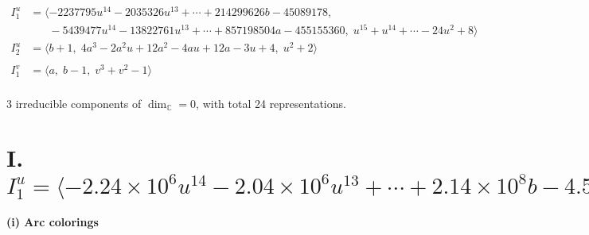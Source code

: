 \documentclass[1p]{elsarticle_modified}
\theoremstyle{definition}
\begin{document}
\begin{align*}
I^u_{1}&=\langle 
-2237795 u^{14}-2035326 u^{13}+\cdots+214299626 b-45089178,\\
\phantom{I^u_{1}}&\phantom{= \langle  }-5439477 u^{14}-13822761 u^{13}+\cdots+857198504 a-455155360,\;u^{15}+u^{14}+\cdots-24 u^2+8\rangle \\
I^u_{2}&=\langle 
b+1,\;4 a^3-2 a^2 u+12 a^2-4 a u+12 a-3 u+4,\;u^2+2\rangle \\
\\
I^v_{1}&=\langle 
a,\;b-1,\;v^3+v^2-1\rangle \\
\end{align*}
\raggedright * 3 irreducible components of $\dim_{\mathbb{C}}=0$, with total 24 representations.\\
\newpage
\renewcommand{\arraystretch}{1}
\centering \section*{I. $I^u_{1}= \langle -2.24\times10^{6} u^{14}-2.04\times10^{6} u^{13}+\cdots+2.14\times10^{8} b-4.51\times10^{7},\;-5.44\times10^{6} u^{14}-1.38\times10^{7} u^{13}+\cdots+8.57\times10^{8} a-4.55\times10^{8},\;u^{15}+u^{14}+\cdots-24 u^2+8 \rangle$}
\flushleft \textbf{(i) Arc colorings}\\
\end{document}
